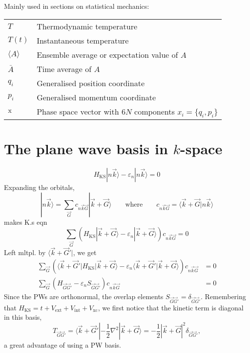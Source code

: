 \documentclass[11pt,bibliography=totoc,index=totoc]{scrbook}   %
\begin{document}
  Mainly used in sections on statistical mechanics:
  
  \begin{tabular}{ll}
    $T$     & Thermodynamic temperature \\
    $T(t)$  & Instantaneous temperature \\
    $\langle A \rangle$ & Ensemble average or expectation value of $A$\\
    $\bar{A}$ & Time average of $A$ \\
    $q_i$   & Generalised position coordinate \\
    $p_i$   & Generalised momentum coordinate \\
    $\mathrm{x}$ & Phase space vector with $6N$ components $x_i=\{q_i,p_i\}$
  \end{tabular}

\chapter{The plane wave basis in $k$-space}\label{app:pwbasis}

\begin{equation}
    H_{\text{KS}} |n\vec{k}\rangle - \varepsilon_n|n\vec{k}\rangle = 0
\end{equation}
Expanding the orbitals,
\begin{equation}
    |n\vec{k}\rangle = \sum_{\vec{G}} c_{n\vec{k}\vec{G}} |\vec{k}+\vec{G}\rangle\qquad\text{where}\qquad c_{n\vec{k}\vec{G}} = \langle \vec{k}+\vec{G}|n\vec{k}\rangle
\end{equation}
makes K.s eqn
\begin{equation}
  \sum_{\vec{G}} \left(H_{\text{KS}} |\vec{k}+\vec{G}\rangle - \varepsilon_n |\vec{k}+\vec{G}\rangle \right) c_{n\vec{k}\vec{G}} = 0
\end{equation}
Left mltpl. by $\langle \vec{k}+\vec{G}'|$, we get
\begin{align}
    \sum_{\vec{G}} \left( \langle \vec{k}+\vec{G}'| H_{\text{KS}} |\vec{k}+\vec{G}\rangle - \varepsilon_n \langle \vec{k}+\vec{G}'|\vec{k}+\vec{G}\rangle \right)c_{n\vec{k}\vec{G}} &= 0 \\
    \sum_{\vec{G}} \left( H_{\vec{G}\vec{G}'} - \varepsilon_n S_{\vec{G}\vec{G}'} \right)c_{n\vec{k}\vec{G}} &= 0
\end{align}
Since the PWs are orthonormal, the overlap elements $S_{\vec{G}\vec{G}'} = \delta_{\vec{G}\vec{G}'}$.
Remembering that $H_{\text{KS}} = t + V_{\text{ext}} + V_{\text{int}} + V_{\text{xc}}$,
we first notice that the kinetic term is diagonal in this basis,
\begin{equation}
    T_{\vec{G}\vec{G}'} = \langle \vec{k}+\vec{G}'| -\frac12\nabla^2 |\vec{k}+\vec{G}\rangle = -\frac12|\vec{k}+\vec{G}|^2 \delta_{\vec{G}\vec{G}'},
\end{equation}
a great advantage of using a PW basis.
\end{document}
